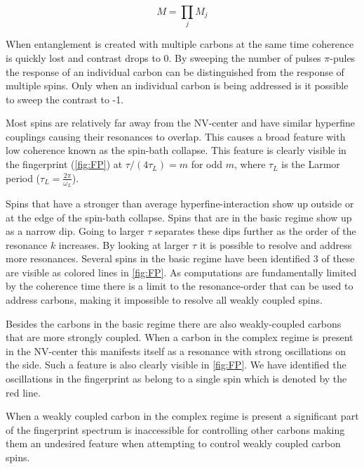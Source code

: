 \begin{equation}
\label{eq:prod_multiple_spins}
    M = \prod_{j}{M_j}
\end{equation}

When entanglement is created with multiple carbons at the same time coherence is quickly lost and contrast drops to 0.
By sweeping the number of pulses $\pi$-pules the response of an individual carbon can be distinguished from the response of multiple spins.
Only when an individual carbon is being addressed is it possible to sweep the contrast to -1.


Most spins are relatively far away from the NV-center and have similar hyperfine couplings causing their resonances to overlap. This causes a broad feature with low coherence known as the spin-bath collapse. This feature is clearly visible in the fingerprint (\cref{fig:FP}) at $\tau/(4\tau_L) = m$ for odd $m$, where $\tau_L$ is the Larmor period ($\tau_L = \frac{2\pi}{\omega_L} $).

Spins that have a stronger than average hyperfine-interaction show up outside or at the edge of the spin-bath collapse.
Spins that are in the basic regime show up as a narrow dip.
Going to larger $\tau$ separates these dips further as the order of the resonance $k$ increases.
By looking at larger $\tau$ it is possible to resolve and address more resonances.
Several spins in the basic regime have been identified 3 of these are visible as colored lines in \cref{fig:FP}.
As computations are fundamentally limited by the coherence time there is a limit to the resonance-order that can be used to address carbons, making it impossible to resolve all weakly coupled spins.

Besides the carbons in the basic regime there are also weakly-coupled carbons that are more strongly coupled.
When a carbon in the complex regime is present in the NV-center this manifests itself as a resonance with strong oscillations on the side. Such a feature is also clearly visible in \cref{fig:FP}. We have identified the oscillations in the fingerprint as belong to a single spin which is denoted by the red line.

When a weakly coupled carbon in the complex regime is present a significant part of the fingerprint spectrum is inaccessible for controlling other carbons making them an undesired feature when attempting to control weakly coupled carbon spins.


